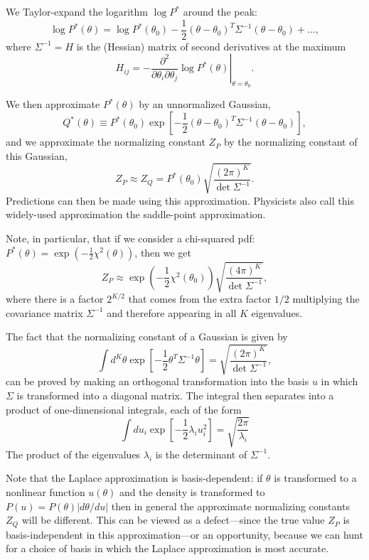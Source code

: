 \documentclass[%
oneside,                 %
final,                   %
10pt]{article}
\begin{document}
We Taylor-expand the logarithm $\log P^*$ around the peak:
$$
\log P^*(\theta) = \log P^*(\theta_0) - \frac{1}{2} (\theta - \theta_0)^T \Sigma^{-1} (\theta - \theta_0) + \ldots,
$$
where $\Sigma^{-1} = H$ is the (Hessian) matrix of second derivatives at the maximum
$$
H_{ij} = - \left. \frac{\partial^2}{\partial \theta_i \partial \theta_j}  \log P^*(\theta)\right|_{\theta=\theta_0}.
$$

We then approximate $P^*(\theta)$ by an unnormalized Gaussian, 
$$
Q^*(\theta) \equiv P^*(\theta_0) \exp \left[ - \frac{1}{2}(\theta - \theta_0)^T \Sigma^{-1} (\theta - \theta_0) \right],
$$
and we approximate the normalizing constant $Z_P$ by the normalizing constant
of this Gaussian,
$$
Z_P \approx Z_Q = P^*(\theta_0) \sqrt{\frac{(2\pi)^K}{\det\Sigma^{-1}}}.
$$
Predictions can then be made using this approximation. Physicists also call this widely-used approximation the saddle-point approximation.

Note, in particular, that if we consider a chi-squared pdf: $P^*(\theta) = \exp \left( -\frac{1}{2} \chi^2(\theta)\right)$, then we get
$$
Z_P \approx \exp \left( -\frac{1}{2} \chi^2(\theta_0)\right) \sqrt{\frac{(4\pi)^K}{\det\Sigma^{-1}}},
$$
where there is a factor $2^{K/2}$ that comes from the extra factor $1/2$ multiplying the covariance matrix $\Sigma^{-1}$ and therefore appearing in all $K$ eigenvalues.

The fact that the normalizing constant of a Gaussian is given by 
$$
\int d^K\theta \exp \left[ - \frac{1}{2}\theta^T \Sigma^{-1} \theta \right] = \sqrt{\frac{(2\pi)^K}{\det\Sigma^{-1}}},
$$
can be proved by making an orthogonal transformation into the basis $u$ in which $\Sigma$ is transformed into a diagonal matrix. The integral then separates into a product of one-dimensional integrals, each of the form
$$
\int du_i \exp \left[ -\frac{1}{2} \lambda_i u_i^2 \right] = \sqrt{\frac{2\pi}{\lambda_i}}
$$
The product of the eigenvalues $\lambda_i$ is the determinant of $\Sigma^{-1}$.

Note that the Laplace approximation is basis-dependent: if $\theta$ is transformed to a nonlinear function $u(\theta)$ and the density is transformed to $P(u) = P(\theta) |d\theta/du|$ then in general the approximate normalizing constants $Z_Q$ will be different. This can be viewed as a defect---since the true value $Z_P$ is basis-independent in this approximation---or an opportunity, because we can hunt for a choice of basis in which the Laplace approximation is most accurate.



\end{document}
